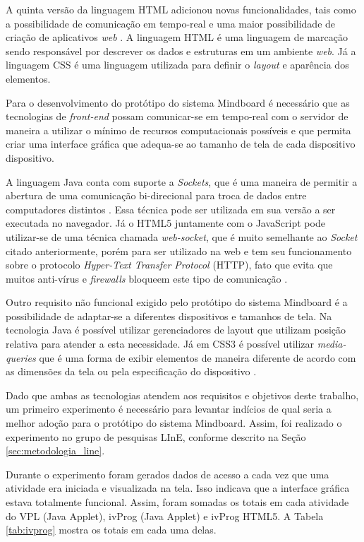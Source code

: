 A quinta versão da linguagem HTML adicionou novas funcionalidades, tais como a possibilidade de comunicação em tempo-real e uma maior possibilidade de criação de aplicativos \emph{web} \cite{html5_intro}. A linguagem HTML é uma linguagem de marcação sendo responsável por descrever os dados e estruturas em um ambiente \emph{web}. Já a linguagem CSS é uma linguagem utilizada para definir o \emph{layout} e aparência dos elementos.

Para o desenvolvimento do protótipo do sistema Mindboard é necessário que as tecnologias de \emph{front-end} possam comunicar-se em tempo-real com o servidor de maneira a utilizar o mínimo de recursos computacionais possíveis e que permita criar uma interface gráfica que adequa-se ao tamanho de tela de cada dispositivo dispositivo.

A linguagem Java conta com suporte a \emph{Sockets}, que é uma maneira de permitir a abertura de uma comunicação bi-direcional para troca de dados entre computadores distintos \cite{sockets}. Essa técnica pode ser utilizada em sua versão a ser executada no navegador. Já o HTML5 juntamente com o JavaScript pode utilizar-se de uma técnica chamada \emph{web-socket}, que é muito semelhante ao \emph{Socket} citado anteriormente, porém para ser utilizado na web e tem seu funcionamento sobre o protocolo \emph{Hyper-Text Transfer Protocol} (HTTP), fato que evita que muitos anti-vírus e \emph{firewalls} bloqueem este tipo de comunicação \cite{websockets}.

Outro requisito não funcional exigido pelo protótipo do sistema Mindboard é a possibilidade de adaptar-se a diferentes dispositivos e tamanhos de tela. Na tecnologia Java é possível utilizar gerenciadores de layout que utilizam posição relativa para atender a esta necessidade. Já em CSS3 é possível utilizar \emph{media-queries} que é uma forma de exibir elementos de maneira diferente de acordo com as dimensões da tela ou pela especificação do dispositivo \cite{css3_media_query}.

Dado que ambas as tecnologias atendem aos requisitos e objetivos deste trabalho, um primeiro experimento é necessário para levantar indícios de qual seria a melhor adoção para o protótipo do sistema Mindboard. Assim, foi realizado o experimento no grupo de pesquisas LInE, conforme descrito na Seção \ref{sec:metodologia_line}.

Durante o experimento foram gerados dados de acesso a cada vez que uma atividade era iniciada e visualizada na tela. Isso indicava que a interface gráfica estava totalmente funcional. Assim, foram somadas os totais em cada atividade do VPL (Java Applet), ivProg (Java Applet) e ivProg HTML5. A Tabela \ref{tab:ivprog} mostra os totais em cada uma delas.

